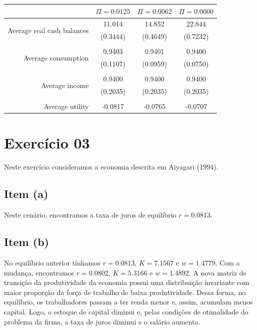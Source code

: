 \documentclass{article}
\begin{document}
\begin{center}

{ %
\renewcommand{\arraystretch}{1.25}
\begin{table}[htbp]
  \centering
    \begin{tabular}{rccc}
    \toprule
          & $\Pi = 0.0125$  & $\Pi = 0.0062$  & $\Pi = 0.0000$ \\
    \midrule
    \multirow{2}[1]{*}{Average real cash balances } & 11.014 & 14.852 & 22.844 \\
          & (0.3444) & (0.4649) & (0.7232) \\ \\
    \multirow{2}[0]{*}{Average consumption } & 0.9403 & 0.9401 & 0.9400 \\
          & (0.1107) & (0.0959) & (0.0750) \\ \\
    \multirow{2}[0]{*}{Average income } & 0.9400 & 0.9400 & 0.9400 \\
          & (0.2035) & (0.2035) & (0.2035) \\ \\
    Average utility  & -0.0817 & -0.0765 & -0.0707 \\
    \bottomrule
    \end{tabular}%
  \label{tab:addlabel}%
\end{table}%
} %

\end{center}



\section*{Exercício 03}

Neste exercício consideramos a economia descrita em Aiyagari (1994).

\subsection*{Item (a)}

Neste cenário, encontramos a taxa de juros de equilíbrio $r=0.0813$.

\subsection*{Item (b)}

No equilíbrio anterior tínhamos $r=0.0813$, $K=7.1567$ e $w=1.4779$. Com a mudança, encontramos $r=0.0802$, $K=5.3166$ e $w=1.4892$. A nova matriz de transição da produtividade da economia possui uma distribuição invariante com maior proporção da força de trabalho de baixa produtividade. Dessa forma, no equilíbrio, os trabalhadores passam a ter renda menor e, assim, acumulam menos capital. Logo, o estoque de capital diminui e, pelas condições de otimalidade do problema da firma, a taxa de juros diminui e o salário aumenta. 
\end{document}

